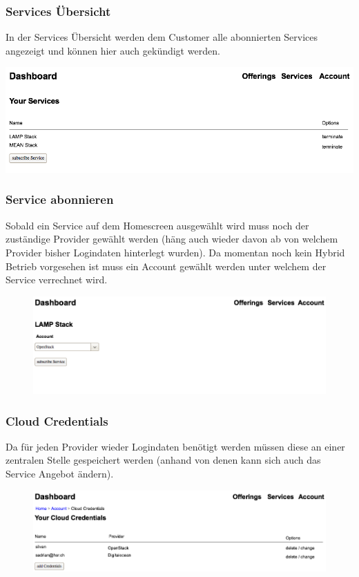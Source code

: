 \documentclass[11pt]{scrartcl}
\begin{document}
\subsubsection{Services Übersicht}
In der Services Übersicht werden dem Customer alle abonnierten Services 
angezeigt und können hier auch gekündigt werden.

\includegraphics[width=\textwidth]{services_overview}


\subsubsection{Service abonnieren}
Sobald ein Service auf dem Homescreen ausgewählt wird muss noch der zuständige 
Provider gewählt werden (häng auch wieder davon ab von welchem Provider bisher Logindaten hinterlegt 
wurden).
Da momentan noch kein Hybrid Betrieb vorgesehen ist muss ein Account gewählt 
werden unter welchem der Service verrechnet wird.
\begin{figure}[h]
  \includegraphics[width=\textwidth]{service_settings}
\end{figure}

\newpage
\subsubsection{Cloud Credentials}
Da für jeden Provider wieder Logindaten benötigt werden müssen diese an einer 
zentralen Stelle gespeichert werden (anhand von denen kann sich auch das Service Angebot 
ändern).
\begin{figure}[h]
\includegraphics[width=\textwidth]{service_accounts}
\end{figure}
\end{document}
